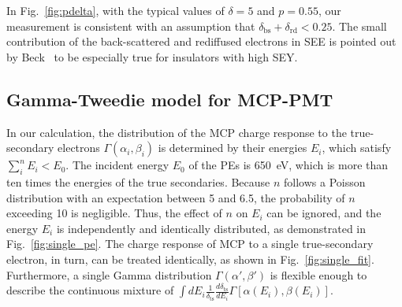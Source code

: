 In Fig.~\ref{fig:pdelta}, with the typical values of \(\delta=5\) and \(p=0.55\),
our measurement is consistent with an assumption that \(\delta_\text{bs} + \delta_\text{rd} < 0.25\).
The small contribution of the back-scattered and rediffused electrons in SEE is pointed out by Beck~\cite{beck_physical_1966} to be especially true for insulators with high SEY.


\subsection{Gamma-Tweedie model for MCP-PMT}\label{sec:model}
In our calculation, the distribution of the MCP charge response to the true-secondary electrons $\varGamma(\alpha_{i},\beta_{i})$ is determined by their energies $E_{i}$,
which satisfy $\sum_{i}^{n}E_{i}<E_0$.
The incident energy \(E_0\) of the PEs is \SI{650}{eV},
which is more than ten times the energies of the true secondaries.
Because $n$ follows a Poisson distribution with an expectation between 5 and 6.5,
the probability of $n$ exceeding 10 is negligible.
Thus, the effect of $n$ on $E_{i}$ can be ignored,
and the energy \(E_{i}\) is independently and identically distributed, as demonstrated in Fig.~\ref{fig:single_pe}.
The charge response of MCP to a single true-secondary electron, in turn, can be treated identically, as shown in Fig.~\ref{fig:single_fit}.
Furthermore, a single Gamma distribution \(\varGamma(\alpha',\beta')\)
is flexible enough to describe the continuous mixture of
\(\int dE_{i}\frac{1}{\delta_{\mathrm{ts}}}\frac{d\delta_{\mathrm{ts}}}{dE_{i}}\varGamma[\alpha(E_{i}),\beta(E_{i})]\).

